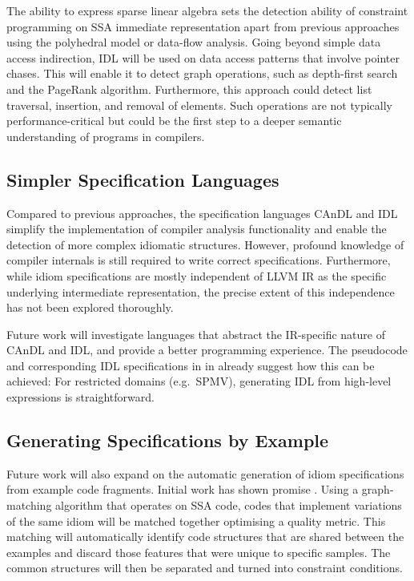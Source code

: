     The ability to express sparse linear algebra sets the detection ability of
    constraint programming on SSA immediate representation apart from previous
    approaches using the polyhedral model or data-flow analysis.
    Going beyond simple data access indirection, IDL will be used on data access
    patterns that involve pointer chases.
    This will enable it to detect graph operations, such as depth-first search
    and the PageRank algorithm.
    Furthermore, this approach could detect list traversal, insertion, and
    removal of elements.
    Such operations are not typically performance-critical but could be the
    first step to a deeper semantic understanding of programs in compilers.

\subsection*{Simpler Specification Languages}

    Compared to previous approaches, the specification languages CAnDL and IDL
    simplify the implementation of compiler analysis functionality and enable
    the detection of more complex idiomatic structures.
    However, profound knowledge of compiler internals is still required to
    write correct specifications.
    Furthermore, while idiom specifications are mostly independent of
    LLVM IR as the specific underlying intermediate representation, the precise
    extent of this independence has not been explored thoroughly.

    Future work will investigate languages that abstract the IR-specific nature
    of CAnDL and IDL, and provide a better programming experience.
    The pseudocode and corresponding IDL specifications in
     in  already
    suggest how this can be achieved:
    For restricted domains (e.g.\ SPMV), generating IDL from high-level
    expressions is straightforward.

\subsection*{Generating Specifications by Example}

    Future work will also expand on the automatic generation of idiom
    specifications from example code fragments.
    Initial work has shown promise \citep{DBLP:conf/IEEEpact/CollieGO19}.
    Using a graph-matching algorithm that operates on SSA code, codes that
    implement variations of the same idiom will be matched together optimising
    a quality metric.
    This matching will automatically identify code structures that are shared
    between the examples and discard those features that were unique to
    specific samples.
    The common structures will then be separated and turned into constraint
    conditions.


